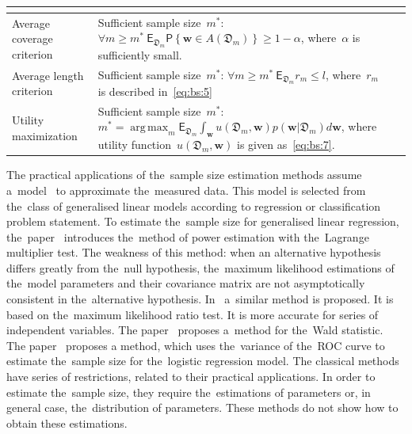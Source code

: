 \documentclass[
11pt,%
tightenlines,%
twoside,%
onecolumn,%
nofloats,%
nobibnotes,%
nofootinbib,%
superscriptaddress,%
noshowpacs,%
centertags]%
{revtex4}
\DeclareMathOperator*{\argmax}{arg\,max}
\begin{document}
\begin{table}
\begin{center}
\begin{tabular}{p{}|p{}|p{}}
	&\cite{joseph1995, joseph1997}\\
\hline
	Average coverage criterion &
	Sufficient sample size~$m^*$:	 $\forall m \geq m^* ~ \mathsf{E}_{\mathfrak{D}_m}\mathsf{P}\left\{\mathbf{w} \in A\left(\mathfrak{D}_m\right)\right\} \geq 1-\alpha$, where~$\alpha$ is sufficiently small.
	&\cite{joseph1995, joseph1997}\\
\hline
	Average length criterion &
	Sufficient sample size~$m^*$:	 $\forall m \geq m^* ~ \mathsf{E}_{\mathfrak{D}_m}r_m\leq l$,  where~$r_m$ is described in~\eqref{eq:bs:5}
	&\cite{joseph1995, joseph1997}\\
\hline
	Utility maximization &
	Sufficient sample size~$m^*$: $m^* = \argmax_{m} \mathsf{E}_{\mathfrak{D}_m}\int_{\mathbf{w}}u\left(\mathfrak{D}_m, \mathbf{w}\right)p(\mathbf{w}|\mathfrak{D}_m)d\mathbf{w}$, where utility function~$u\left(\mathfrak{D}_m, \mathbf{w}\right)$ is given as~\eqref{eq:bs:7}.
	&\cite{lindley1997}\\
\hline
\end{tabular}
\end{center}
\end{table}

The practical applications of the~sample size estimation methods assume a~model~\cite{kloek1975} to approximate the~measured data. This model is selected from the~class of generalised linear models according to regression or classification problem statement. To estimate the~sample size for generalised linear regression, the~paper~\cite{self1988} introduces the~method of power estimation with the~Lagrange multiplier test. The weakness of this method: when an alternative hypothesis differs greatly from the~null hypothesis, the~maximum likelihood estimations of the~model parameters and their covariance matrix are not asymptotically consistent in the~alternative hypothesis. In~\cite{self1992} a~similar method is proposed. It is based on the~maximum likelihood ratio test. It is more accurate for series of independent variables. The paper~\cite{shieh2005} proposes a~method for the~Wald statistic. The paper~\cite{motrenko2014} proposes a method, which uses the~variance of the~ROC curve to estimate the~sample size for the~logistic regression model. The classical methods~\cite{self1988, self1992, shieh2000, shieh2005} have series of restrictions, related to their practical applications. In order to estimate the~sample size, they require the~estimations of parameters or, in general case, the~distribution of parameters. These methods do not show how to obtain these estimations. %
\end{document}
